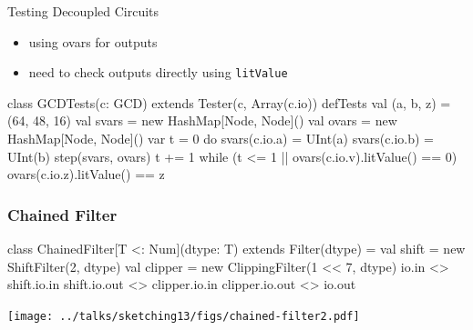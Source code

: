 \documentclass[xcolor=pdflatex,dvipsnames,table]{beamer}
\begin{document}
\begin{frame}[fragile]{Testing Decoupled Circuits}

\begin{itemize}
\item using ovars for outputs
\item need to check outputs directly using \verb+litValue+
\end{itemize}
\begin{scala}
class GCDTests(c: GCD) extends Tester(c, Array(c.io)) {
  defTests {
    val (a, b, z) = (64, 48, 16)
    val svars = new HashMap[Node, Node]()
    val ovars = new HashMap[Node, Node]()
    var t = 0
    do {
      svars(c.io.a) = UInt(a)
      svars(c.io.b) = UInt(b)
      step(svars, ovars)
      t += 1
    } while (t <= 1 || ovars(c.io.v).litValue() == 0)
    ovars(c.io.z).litValue() == z
  }
}
\end{scala}

\end{frame}

\begin{frame}[fragile]
\frametitle{Chained Filter}

\begin{footnotesize}
\begin{scala}
class ChainedFilter[T <: Num](dtype: T) extends Filter(dtype) = {
  val shift   = new ShiftFilter(2, dtype)
  val clipper = new ClippingFilter(1 << 7, dtype)
  io.in          <> shift.io.in
  shift.io.out   <> clipper.io.in
  clipper.io.out <> io.out
}
\end{scala}
\end{footnotesize}

\begin{center}
\texttt{[image: ../talks/sketching13/figs/chained-filter2.pdf]} 
\end{center}
\end{frame}
\end{document}
